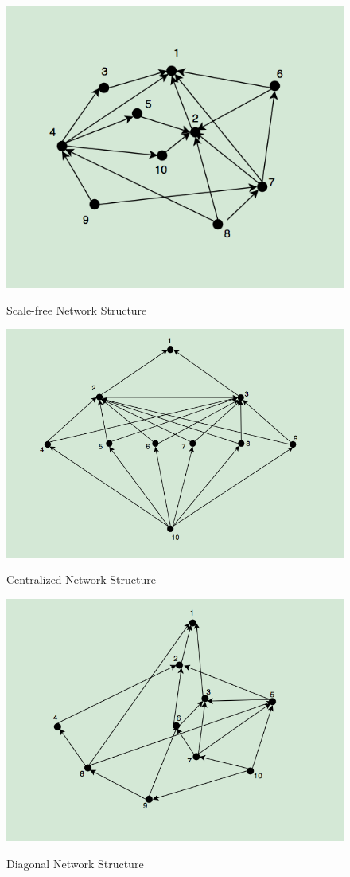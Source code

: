\begin{figure}[H]
  \centering
  \includegraphics[width=4.5in]{figures/pdf/ScaleFree.png}\\
  \caption{Scale-free Network Structure} \label{SFNS}
\end{figure}

\begin{figure}[H]
  \centering
  \includegraphics[width=4.5in]{figures/pdf/Centralized.png}\\
  \caption{Centralized Network Structure} \label{CNS}
\end{figure}

\begin{figure}[H]
  \centering
  \includegraphics[width=4.5in]{figures/pdf/Diagonal.png}\\
  \caption{Diagonal Network Structure} \label{DNS}
\end{figure}

